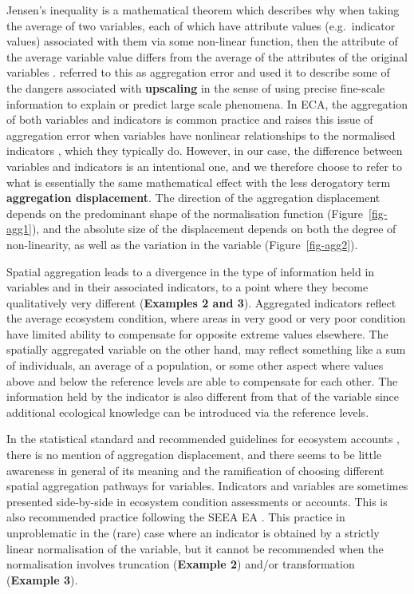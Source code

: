 \documentclass[
  authoryear,
  preprint,
  3p]{elsarticle}
\begin{document}
Jensen's inequality is a mathematical theorem which describes why when
taking the average of two variables, each of which have attribute values
(e.g.~indicator values) associated with them via some non-linear
function, then the attribute of the average variable value differs from
the average of the attributes of the original variables
\citep{ruel_jensens_1999}. \citet{rastetter1992} referred to this as
aggregation error and used it to describe some of the dangers associated
with \textbf{upscaling} in the sense of using precise fine-scale
information to explain or predict large scale phenomena. In ECA, the
aggregation of both variables and indicators is common practice and
raises this issue of aggregation error when variables have nonlinear
relationships to the normalised indicators \citep{rastetter1992}, which
they typically do. However, in our case, the difference between
variables and indicators is an intentional one, and we therefore choose
to refer to what is essentially the same mathematical effect with the
less derogatory term \textbf{aggregation displacement}. The direction of
the aggregation displacement depends on the predominant shape of the
normalisation function (Figure~\ref{fig-agg1}), and the absolute size of
the displacement depends on both the degree of non-linearity, as well as
the variation in the variable (Figure~\ref{fig-agg2}).

Spatial aggregation leads to a divergence in the type of information
held in variables and in their associated indicators, to a point where
they become qualitatively very different (\textbf{Examples 2 and 3}).
Aggregated indicators reflect the average ecosystem condition, where
areas in very good or very poor condition have limited ability to
compensate for opposite extreme values elsewhere. The spatially
aggregated variable on the other hand, may reflect something like a sum
of individuals, an average of a population, or some other aspect where
values above and below the reference levels are able to compensate for
each other. The information held by the indicator is also different from
that of the variable since additional ecological knowledge can be
introduced via the reference levels.

In the statistical standard and recommended guidelines for ecosystem
accounts
\citetext{\citealp{unitednations2024}; \citeyear{unitednations2022}},
there is no mention of aggregation displacement, and there seems to be
little awareness in general of its meaning and the ramification of
choosing different spatial aggregation pathways for variables.
Indicators and variables are sometimes presented side-by-side in
ecosystem condition assessments or accounts. This is also recommended
practice following the SEEA EA \citep[ch.~5.3.4]{unitednations2024}.
This practice in unproblematic in the (rare) case where an indicator is
obtained by a strictly linear normalisation of the variable, but it
cannot be recommended when the normalisation involves truncation
(\textbf{Example 2}) and/or transformation (\textbf{Example 3}).
\end{document}
